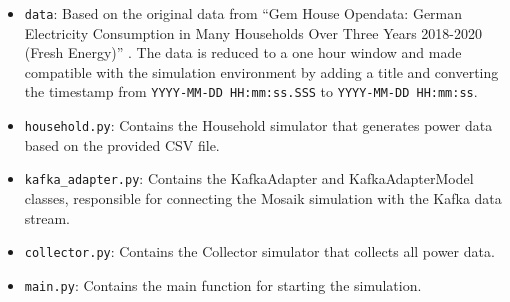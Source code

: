 \documentclass[a4paper]{article}
\begin{document}
\begin{itemize}

    \item \texttt{data}: Based on the original data from \enquote{Gem House
        Opendata: German Electricity Consumption in Many Households Over Three
    Years 2018-2020 (Fresh Energy)} \cite{milojkovic2021}. The data is reduced
    to a one hour window and made compatible with the simulation environment by
    adding a title and converting the timestamp from \texttt{YYYY-MM-DD
    HH:mm:ss.SSS} to \texttt{YYYY-MM-DD HH:mm:ss}.

    \item \texttt{household.py}: Contains the Household simulator that generates
        power data based on the provided CSV file.

    \item \texttt{kafka\_adapter.py}: Contains the KafkaAdapter and
        KafkaAdapterModel classes, responsible for connecting the Mosaik
        simulation with the Kafka data stream.

    \item \texttt{collector.py}: Contains the Collector simulator that collects
        all power data.

    \item \texttt{main.py}: Contains the main function for starting the
        simulation.


\end{itemize}
\end{document}
